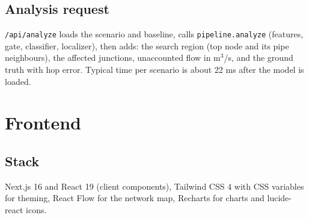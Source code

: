 \documentclass[11pt,a4paper]{article}
\newcommand{\code}[1]{\texttt{#1}}
\begin{document}
\subsection{Analysis request}
\code{/api/analyze} loads the scenario and baseline, calls \code{pipeline.analyze} (features, gate, classifier, localizer), then adds: the search region (top node and its pipe neighbours), the affected junctions, unaccounted flow in m$^3$/s, and the ground truth with hop error. Typical time per scenario is about 22 ms after the model is loaded.

\section{Frontend}
\subsection{Stack}
Next.js 16 and React 19 (client components), Tailwind CSS 4 with CSS variables for theming, React Flow for the network map, Recharts for charts and lucide-react icons.
\end{document}
